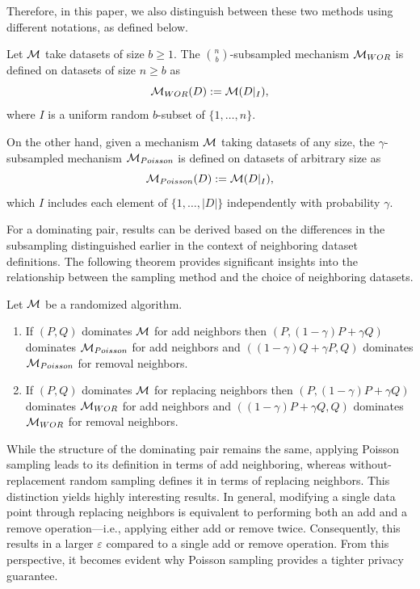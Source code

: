 \documentclass{article}
\begin{document}
Therefore, in this paper, we also distinguish between these two methods using different notations, as defined below.

\begin{definition}[Subsampling]
    Let ${\mathcal{M}}$ take datasets of size $b \ge 1$. The $\binom{n}{b}$-subsampled mechanism ${\mathcal{M}}_{WOR}$ is defined on datasets of size $n \ge b$ as 
    \begin{equation*}
        {\mathcal{M}}_{WOR}(D) := {\mathcal{M}}(D|_I),
    \end{equation*}
    where $I$ is a uniform random $b$-subset of $\{1,\dots , n\}$.
    
    On the other hand, given a mechanism ${\mathcal{M}}$ taking datasets of any size, the $\gamma$-subsampled mechanism ${\mathcal{M}}_{Poisson}$ is defined on datasets of arbitrary size as
    \begin{equation*}
        {\mathcal{M}}_{Poisson}(D) := {\mathcal{M}}(D|_I),
    \end{equation*}
    which $I$ includes each element of $\{1, \dots , |D|\}$ independently with probability $\gamma$.
\end{definition}

For a dominating pair, results can be derived based on the differences in the subsampling  distinguished earlier in the context of neighboring dataset definitions. The following theorem provides significant insights into the relationship between the sampling method and the choice of neighboring datasets.

\begin{theorem}\label{samplingandneighbor}
    Let ${\mathcal{M}}$ be a randomized algorithm.
    \begin{enumerate}
        \item If $(P,Q)$ dominates ${\mathcal{M}}$ for add neighbors then $(P,(1-\gamma)P + \gamma Q)$ dominates ${\mathcal{M}}_{Poisson}$ for add neighbors and $((1-\gamma)Q+\gamma P,Q)$ dominates ${\mathcal{M}}_{Poisson}$ for removal neighbors.
        \item If $(P,Q)$ dominates ${\mathcal{M}}$ for replacing neighbors then $(P,(1-\gamma)P + \gamma Q)$ dominates ${\mathcal{M}}_{WOR}$ for add neighbors and $((1-\gamma)P+\gamma Q,Q)$ dominates ${\mathcal{M}}_{WOR}$ for removal neighbors.
    \end{enumerate}
\end{theorem}

While the structure of the dominating pair remains the same, applying Poisson sampling leads to its definition in terms of add neighboring, whereas without-replacement random sampling defines it in terms of replacing neighbors. This distinction yields highly interesting results. In general, modifying a single data point through replacing neighbors is equivalent to performing both an add and a remove operation—i.e., applying either add or remove twice. Consequently, this results in a larger $\varepsilon$ compared to a single add or remove operation. From this perspective, it becomes evident why Poisson sampling provides a tighter privacy guarantee.
\end{document}
